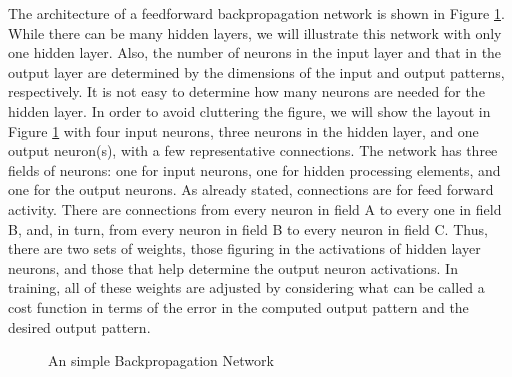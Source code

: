 \documentclass[12pt, right open]{memoir}
\begin{document}
The architecture of a feedforward backpropagation network is shown in Figure \ref{fig:simple_backpropagation}. While there can be many hidden layers, we will illustrate this network with only one hidden layer. Also, the number of neurons in the input layer and
that in the output layer are determined by the dimensions of the input and
output patterns, respectively. It is not easy to determine how many neurons are
needed for the hidden layer. In order to avoid cluttering the figure, we will
show the layout in Figure \ref{fig:simple_backpropagation} with four input neurons, three neurons in the
hidden layer, and one output neuron(s), with a few representative connections.
The network has three fields of neurons: one for input neurons, one for hidden
processing elements, and one for the output neurons. As already stated,
connections are for feed forward activity. There are connections from every
neuron in field A to every one in field B, and, in turn, from every neuron in
field B to every neuron in field C. Thus, there are two sets of weights, those
figuring in the activations of hidden layer neurons, and those that help
determine the output neuron activations. In training, all of these weights are
adjusted by considering what can be called a cost function in terms of the error
in the computed output pattern and the desired output pattern. \\
\def\layersep{2.5cm}
\begin{figure}[ht!]
\caption{An simple Backpropagation Network} 
\label{fig:simple_backpropagation}
\centering
{}
\end{figure}
\end{document}
